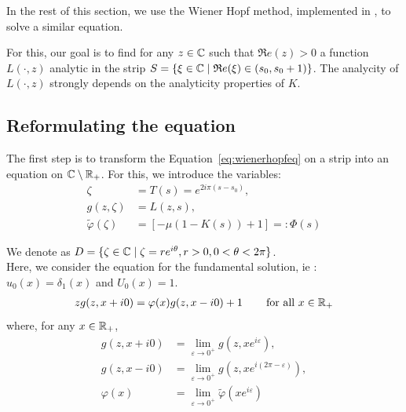 \documentclass[11pt]{amsart}
\renewcommand{\Re}{\mathfrak{R}e}
\begin{document}
In the rest of this section, we use the Wiener Hopf method, implemented in \cite{escobedo2007fundamental}, to solve a similar equation. 
\medskip

For this, our goal is to find for any $z \in \mathbb{C}$ such that $\Re(z) > 0$ a function $L(\cdot,z)$ analytic in the strip $S = \{\xi \in \CC \mid \Re(\xi) \in (s_0, s_0+1)\}$. 
The analycity of $L(\cdot,z)$ strongly depends on the analyticity properties of $K$.\\



\subsection{Reformulating the equation}

The first step is to transform the Equation~\eqref{eq:wienerhopfeq} on a strip into an equation on $\mathbb{C} \setminus \mathbb{R}_+$. For this, we introduce the variables:
    \begin{align}
        \zeta &= T(s) = e^{2i\pi(s-s_0)},\\
        g(z,\zeta) &= L(z,s), \\
        \tilde \varphi(\zeta) &= \left[- \mu (1-K(s)) + 1\right] =: 
        \Phi(s)
    \end{align}

We denote as $D = \{ \zeta \in \mathbb{C} \mid \zeta = re^{i\theta}, r > 0, 0 < \theta < 2\pi \}$. \\

Here, we consider the equation for the fundamental solution, ie : $u_0(x) = \delta_1(x)$ and $U_0(x) = 1$.
\begin{align}
    \label{eq:WH3.5}
    zg(z, x+i0) = \varphi(x)g(z, x-i0) + 1 \, \qquad \text{for all $x\in\mathbb{R}_+$}
\end{align}
where, for any $x \in \mathbb{R}_+$, 
\begin{align*}
    g(z, x+i0) &= \lim_{\varepsilon\to 0^+}  g(z, xe^{i\varepsilon}),\\
    g(z, x-i0) &= \lim_{\varepsilon\to 0^+}  g(z, xe^{i(2\pi-\varepsilon)}),\\
    \varphi(x) &= \lim_{\varepsilon\to 0^+}\tilde \varphi(xe^{i\varepsilon}) 
\end{align*}
\end{document}
